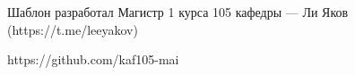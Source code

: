 Шаблон разработал Магистр 1 курса 105 кафедры --- Ли Яков (https://t.me/leeyakov)

https://github.com/kaf105-mai